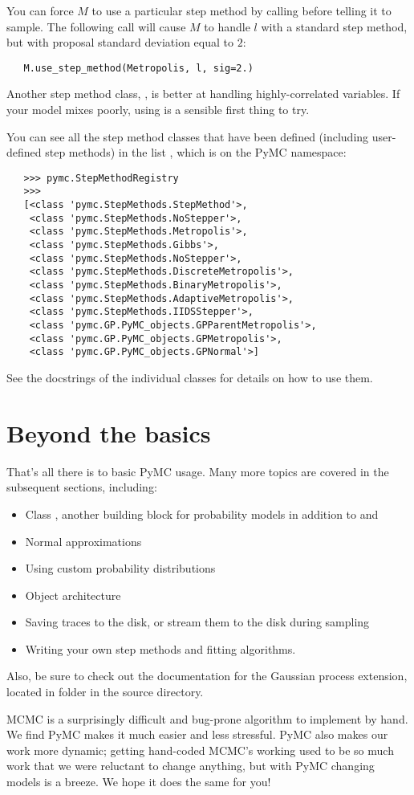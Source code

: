 You can force $M$ to use a particular step method by calling  before telling it to sample. The following call will cause $M$ to handle $l$ with a standard  step method, but with proposal standard deviation equal to $2$:
\begin{verbatim}
   M.use_step_method(Metropolis, l, sig=2.)
\end{verbatim}

Another step method class, , is better at handling highly-correlated variables. If your model mixes poorly, using  is a sensible first thing to try.

You can see all the step method classes that have been defined (including user-defined step methods) in the list , which is on the PyMC namespace: 
\begin{verbatim}
   >>> pymc.StepMethodRegistry
   >>> 
   [<class 'pymc.StepMethods.StepMethod'>,
    <class 'pymc.StepMethods.NoStepper'>,
    <class 'pymc.StepMethods.Metropolis'>,
    <class 'pymc.StepMethods.Gibbs'>,
    <class 'pymc.StepMethods.NoStepper'>,
    <class 'pymc.StepMethods.DiscreteMetropolis'>,
    <class 'pymc.StepMethods.BinaryMetropolis'>,
    <class 'pymc.StepMethods.AdaptiveMetropolis'>,
    <class 'pymc.StepMethods.IIDSStepper'>,
    <class 'pymc.GP.PyMC_objects.GPParentMetropolis'>,
    <class 'pymc.GP.PyMC_objects.GPMetropolis'>,
    <class 'pymc.GP.PyMC_objects.GPNormal'>]
\end{verbatim}
See the docstrings of the individual classes for details on how to use them.

\section*{Beyond the basics}
That's all there is to basic PyMC usage. Many more topics are covered in the subsequent sections, including:
\begin{itemize}
   \item Class , another building block for probability models in addition to  and 
   \item Normal approximations
   \item Using custom probability distributions
   \item Object architecture
   \item Saving traces to the disk, or stream them to the disk during sampling
   \item Writing your own step methods and fitting algorithms.
\end{itemize}
Also, be sure to check out the documentation for the Gaussian process extension, located in folder  in the source directory. 

\bigskip
MCMC is a surprisingly difficult and bug-prone algorithm to implement by hand. We find PyMC makes it much easier and less stressful. PyMC also makes our work more dynamic; getting hand-coded MCMC's working used to be so much work that we were reluctant to change anything, but with PyMC changing models is a breeze. We hope it does the same for you!
